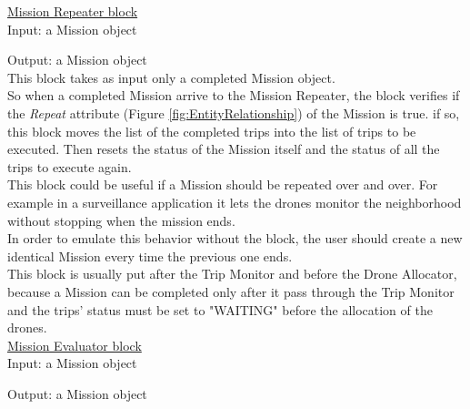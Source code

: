 \underline{Mission Repeater block}
\\

Input: a Mission object

Output: a Mission object
\\

This block takes as input only a completed Mission object.
\\
So when a completed Mission arrive to the Mission Repeater, the block verifies if the \textit{Repeat} attribute (Figure \ref{fig:EntityRelationship}) of the Mission is true.
if so, this block moves the list of the completed trips into the list of trips to be executed.
Then resets the status of the Mission itself and the status of all the trips to execute again.
\\
This block could be useful if a Mission should be repeated over and over.
For example in a surveillance application it lets the drones monitor the neighborhood without stopping when the mission ends.
\\
In order to emulate this behavior without the block, the user should create a new identical Mission every time the previous one ends.
\\
This block is usually put after the Trip Monitor and before the Drone Allocator, because a Mission can be completed only after it pass through the Trip Monitor and the trips' status must be set to "WAITING" before the allocation of the drones.
\\

\underline{Mission Evaluator block}
\\

Input: a Mission object

Output: a Mission object
\\

